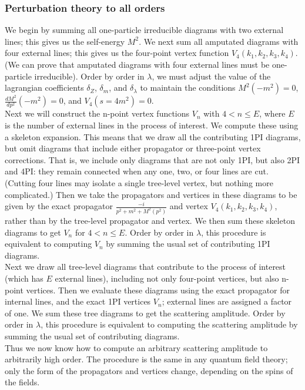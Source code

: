 \documentclass[cyan]{elegantnote}
\begin{document}
\subsubsection{Perturbation theory to all orders}
We begin by summing all one-particle irreducible diagrams with two external lines; this gives us the self-energy $M^2$. We next sum all amputated diagrams with four external lines; this gives us the four-point vertex function $V_4(k_1, k_2, k_3, k_4)$. (We can prove that amputated diagrams with four external lines must be one-particle irreducible). Order by order in $\lambda$, we must adjust the value of the lagrangian coefficients $\delta_Z$, $\delta_m$, and $\delta_{\lambda}$ to maintain the conditions $M^2(-m^2) = 0$, $\frac{dM^2}{dp^2}(-m^2) = 0$, and $V_4(s=4m^2) =0$. 
\\
Next we will construct the n-point vertex functions $V_n$ with $4 < n \leq E$, where $E$ is the number of external lines in the process of interest. We compute these using a skeleton expansion. This means that we draw all the contributing 1PI diagrams, but omit diagrams that include either propagator or three-point vertex corrections. That is, we include only diagrams that are not only 1PI, but also 2PI and 4PI: they remain connected when any one, two, or four lines are cut. (Cutting four lines may isolate a single tree-level vertex, but nothing more complicated.) Then we take the propagators and vertices in these diagrams to be given by the exact propagator $\frac{-i}{p^2+m^2+M^2(p^2)}$ and vertex $V_4(k_1,k_2,k_3,k_4)$, rather than by the tree-level propagator and vertex. We then sum these skeleton diagrams to get $V_n$ for $4 < n \leq E$. Order by order in $\lambda$, this procedure is
equivalent to computing $V_n$ by summing the usual set of contributing 1PI diagrams.
\\
Next we draw all tree-level diagrams that contribute to the process of interest (which has $E$ external lines), including not only four-point vertices, but also n-point vertices. Then we evaluate these diagrams using the exact propagator for internal lines, and the exact 1PI vertices $V_n$; external lines are assigned a factor of one. We sum these tree diagrams to get the scattering amplitude. Order by order in $\lambda$, this procedure is equivalent to computing the scattering amplitude by summing the usual set of contributing diagrams.
\\
Thus we now know how to compute an arbitrary scattering amplitude
to arbitrarily high order. The procedure is the same in any quantum field theory; only the form of the propagators and vertices change, depending on the spins of the fields.
\end{document}
